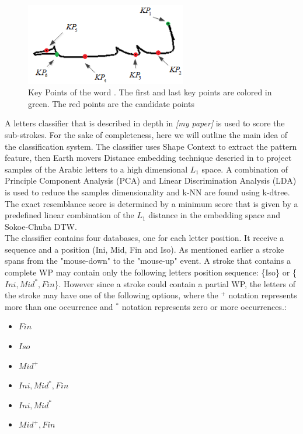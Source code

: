 \documentclass[journal,compsoc]{IEEEtran}
\begin{document}
\begin{figure}
\centering
\includegraphics[width=7cm]{./figures/candidate_points}
\caption{Key Points of the word  . The first and last key points are colored in green. The red points are the candidate points}
\label{fig:candidate_points}
\end{figure}

A letters classifier that is described in depth in \emph{[my paper]} is used to score the sub-strokes. For the sake of completeness, here we will outline the main idea of the classification system. The classifier uses Shape Context to extract the pattern feature, then Earth movers Distance embedding technique descried in \cite{shirdhonkar2008approximate} to project samples of the Arabic letters to a high dimensional $L_{1}$ space. A combination of Principle Component Analysis (PCA) and Linear Discrimination Analysis (LDA) is used to reduce the samples dimensionality and k-NN are found using k-dtree. The exact resemblance score is determined by a minimum score that is given by a predefined linear combination of the $L_{1}$ distance in the embedding space and Sokoe-Chuba DTW.\\

The classifier contains four databases, one for each letter position. It receive a sequence and a position (Ini, Mid, Fin and Iso).
As mentioned earlier a stroke spans from the "mouse-down" to the "mouse-up" event. A stroke that contains a complete WP may contain only the following letters position sequence: \{Iso\} or \{$Ini,Mid^{*},Fin$\}.
However since a stroke could contain a partial WP, the letters of the stroke may have one of the following options, where the  $^{+}$ notation represents more than one occurrence and $^{*}$ notation represents zero or more occurrences.:
\begin{multicols}{2}
\begin{itemize}
    \item $Fin$
    \item $Iso$
    \item $Mid^{+}$
    \item $Ini,Mid^{*},Fin$
    \item $Ini,Mid^{*}$
    \item $Mid^{+},Fin$
\end{itemize}
\end{multicols}
 
\end{document}
